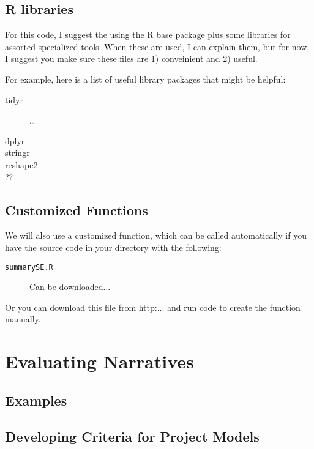 \documentclass{article}\usepackage[]{graphicx}\usepackage[]{color}
\begin{document}
\subsection{R libraries}

For this code, I suggest the using the R base package plus some libraries for assorted specialized tools. When these are used, I can explain them, but for now, I suggest you make sure these files are 1) conveinient and 2) useful. 

For example, here is a list of useful library packages that might be helpful:

\begin{description}
  \item[tidyr] \ldots
  \item[dplyr]
  \item[stringr]
  \item[reshape2]
  \item[??]
\end{description}

\subsection{Customized Functions}

We will also use a customized function, which can be called automatically if you have the source code in your directory with the following: 
\begin{description}
  \item[\texttt{summarySE.R}] Can be downloaded...
\end{description}


Or you can download this file from http:... and run code to create the function manually. 

\section{Evaluating Narratives}

\subsection{Examples}


\subsection{Developing Criteria for Project Models}

\subsection{}

\subsection{}
\end{document}
